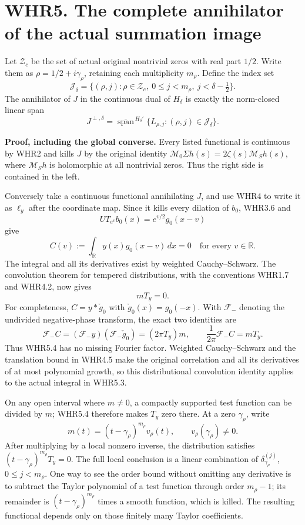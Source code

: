 \section{WHR5. The complete annihilator of the actual summation
image}\label{whr5.-the-complete-annihilator-of-the-actual-summation-image}

Let \(\mathscr Z_c\) be the set of actual original nontrivial zeros with
real part \(1/2\). Write them as \(\rho=1/2+i\gamma_\rho\), retaining
each multiplicity \(m_\rho\). Define the index set \[
 \mathscr J_\delta=\{(\rho,j):\rho\in\mathscr Z_c,
                   \ 0\leq j<m_\rho,
                   \ j<\delta-\tfrac12\}.
 \tag{WHR5.1}
\] The annihilator of \(J\) in the continuous dual of \(H_\delta\) is
exactly the norm-closed linear span \[
 \boxed{J^{\perp,\delta}
   =\overline{\operatorname{span}}^{\,H_\delta'}
                  \{L_{\rho,j}:(\rho,j)\in\mathscr J_\delta\}.}
 \tag{WHR5.2}
\]

\textbf{Proof, including the global converse.} Every listed functional
is continuous by WHR2 and kills \(J\) by the original identity
\(\mathcal M_0\Sigma h(s)=2\zeta(s)\mathcal M_Sh(s)\), where
\(\mathcal M_Sh\) is holomorphic at all nontrivial zeros. Thus the right
side is contained in the left.

Conversely take a continuous functional annihilating \(J\), and use WHR4
to write it as \(\ell_y\) after the coordinate map. Since it kills every
dilation of \(b_0\), WHR3.6 and \[
 U T_{e^v}b_0(x)=e^{v/2}g_0(x-v)
\] give \[
 C(v):=\int_{\mathbb R}y(x)g_0(x-v)\,dx=0
 \quad\text{for every }v\in\mathbb R.
 \tag{WHR5.3}
\] The integral and all its derivatives exist by weighted
Cauchy--Schwarz. The convolution theorem for tempered distributions,
with the conventions WHR1.7 and WHR4.2, now gives \[
 mT_y=0.
 \tag{WHR5.4}
\] For completeness, \(C=y*\check g_0\) with \(\check g_0(x)=g_0(-x)\).
With \(\mathcal F_-\) denoting the undivided negative-phase transform,
the exact two identities are \[
 \mathcal F_-C=(\mathcal F_-y)(\mathcal F_-\check g_0)
             =(2\pi T_y)m,\qquad
 \frac1{2\pi}\mathcal F_-C=mT_y.
\] Thus WHR5.4 has no missing Fourier factor. Weighted Cauchy--Schwarz
and the translation bound in WHR4.5 make the original correlation and
all its derivatives of at most polynomial growth, so this distributional
convolution identity applies to the actual integral in WHR5.3.

On any open interval where \(m\ne0\), a compactly supported test
function can be divided by \(m\); WHR5.4 therefore makes \(T_y\) zero
there. At a zero \(\gamma_\rho\), write \[
 m(t)=(t-\gamma_\rho)^{m_\rho}v_\rho(t),
 \qquad v_\rho(\gamma_\rho)\ne0.
\] After multiplying by a local nonzero inverse, the distribution
satisfies \((t-\gamma_\rho)^{m_\rho}T_y=0\). The full local conclusion
is a linear combination of \(\delta_{\gamma_\rho}^{(j)}\),
\(0\leq j<m_\rho\). One way to see the order bound without omitting any
derivative is to subtract the Taylor polynomial of a test function
through order \(m_\rho-1\); its remainder is
\((t-\gamma_\rho)^{m_\rho}\) times a smooth function, which is killed.
The resulting functional depends only on those finitely many Taylor
coefficients.

